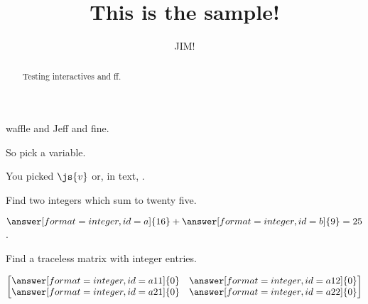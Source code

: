 \documentclass{ximera}
\title{This is the sample!}
\author{JIM!}
\begin{document}
\begin{abstract}
Testing interactives and ff.
\end{abstract}
\maketitle

waffle and Jeff and fine.


\begin{problem}
  So pick a variable.
  \begin{multipleChoice}[id=v]
  \end{multipleChoice}

  You picked $\js{v}$ or, in text, .



  \begin{validator}[bob.n_e == 3]
  

  \end{validator}

\end{problem}

\begin{problem}
  Find two integers which sum to twenty five.

  \begin{validator}[a+b==25]
    $\answer[format=integer,id=a]{16} + \answer[format=integer,id=b]{9} = 25$.
  \end{validator}

  Find a traceless matrix with integer entries.
  \begin{validator}[a11+a22==0]
    \[
      \begin{bmatrix}
        \answer[format=integer,id=a11]{0} &         \answer[format=integer,id=a12]{0} \\
        \answer[format=integer,id=a21]{0} &         \answer[format=integer,id=a22]{0} \\
      \end{bmatrix}
      \]
  \end{validator}


\end{problem}
\end{document}
